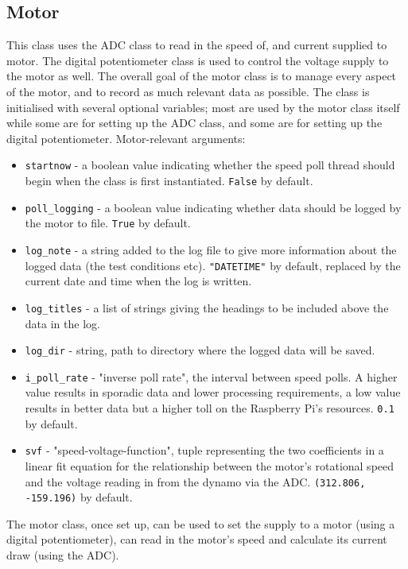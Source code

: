 \documentclass[twoside,a4]{report}
\def\br{\newline \newline \noindent}
\begin{document}
	\subsection*{Motor} %
	This class uses the ADC class to read in the speed of, and current supplied to motor. The digital potentiometer class is used to control the voltage supply to the motor as well. The overall goal of the motor class is to manage every aspect of the motor, and to record as much relevant data as possible. \br
	The class is initialised with several optional variables; most are used by the motor class itself while some are for setting up the ADC class, and some are for setting up the digital potentiometer.\br
	Motor-relevant arguments:
	\begin{itemize}
		\item \texttt{startnow} - a boolean value indicating whether the speed poll thread should begin when the class is first instantiated. \texttt{False} by default.
		\item \texttt{poll\_logging} - a boolean value indicating whether data should be logged by the motor to file. \texttt{True} by default.
		\item \texttt{log\_note} - a string added to the log file to give more information about the logged data (the test conditions etc). \texttt{"DATETIME"} by default, replaced by the current date and time when the log is written.
		\item \texttt{log\_titles} - a list of strings giving the headings to be included above the data in the log.
		\item \texttt{log\_dir} - string, path to directory where the logged data will be saved.
		\item \texttt{i\_poll\_rate} - "inverse poll rate", the interval between speed polls. A higher value results in sporadic data and lower processing requirements, a low value results in better data but a higher toll on the Raspberry Pi's resources. \texttt{0.1} by default.
		\item \texttt{svf} - "speed-voltage-function", tuple representing the two coefficients in a linear fit equation for the relationship between the motor's rotational speed and the voltage reading in from the dynamo via the ADC. \texttt{(312.806, -159.196)} by default.
	\end{itemize}
	The motor class, once set up, can be used to set the supply to a motor (using a digital potentiometer), can read in the motor's speed and calculate its current draw (using the ADC).
	
\end{document}
